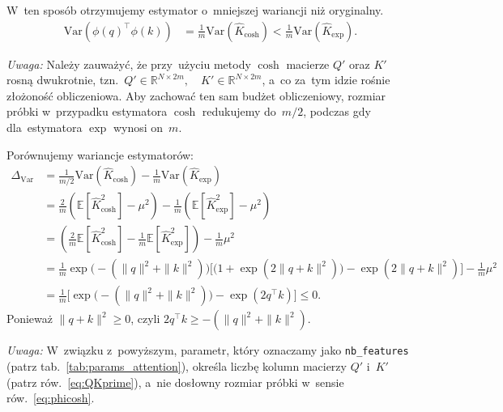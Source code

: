 \documentclass[a4paper,11pt,twoside]{report}
\theoremstyle{definition}
\begin{document}
W~ten sposób otrzymujemy estymator o~mniejszej wariancji niż oryginalny.
\begin{equation}
\begin{aligned}
\mathrm{Var}(\phi(q)^\top \phi(k)) &= \frac{1}{m} \mathrm{Var}(\hat K_{\mathrm{\cosh}}) <  \frac{1}{m} \mathrm{Var}(\hat K_{\mathrm{\exp}}).
\end{aligned}
\end{equation}




\textit{Uwaga:} Należy zauważyć, że przy~użyciu metody $\cosh$ macierze $Q'$ oraz $K'$ rosną dwukrotnie, tzn.\ $Q' \in \mathbb{R}^{N\times 2m}, \quad K' \in \mathbb{R}^{N\times 2m}$, a~co za~tym idzie rośnie złożoność obliczeniowa. Aby zachować ten sam budżet obliczeniowy, rozmiar próbki w~przypadku estymatora $\cosh$ redukujemy do~$m/2$, podczas gdy dla~estymatora $\exp$ wynosi on~$m$.

Porównujemy wariancje estymatorów: 
\begin{equation}
\begin{aligned}
\Delta_{\mathrm{Var}} 
&= \frac{1}{m/2} \mathrm{Var}(\hat K_{\cosh}) - \frac{1}{m} \mathrm{Var}(\hat K_{\exp}) \\
&= \frac{2}{m}\left(\mathbb{E}[\hat K_{\cosh}^2] - \mu^2\right) - \frac{1}{m}\left(\mathbb{E}[\hat K_{\exp}^2] - \mu^2\right) \\
&= \left( \frac{2}{m}\mathbb{E}[\hat K_{\cosh}^2] - \frac{1}{m}\mathbb{E}[\hat K_{\exp}^2] \right) - \frac{1}{m}\mu^2 \\
&= \frac{1}{m}\exp\big(-(\|q\|^2+\|k\|^2)\big)\Bigg[ \big(1+\exp(2\|q+k\|^2)\big) - \exp(2\|q+k\|^2) \Bigg] - \frac{1}{m}\mu^2 \\
&= \frac{1}{m} \big[ \exp\big(-(\|q\|^2+\|k\|^2)\big) - \exp(2q^\top k) \big] \leq 0.
\end{aligned}
\end{equation}
Ponieważ $\|q+k\|^2 \geq 0$, czyli $2q^\top k \geq -(\|q\|^2+\|k\|^2)$.

\textit{Uwaga:} W~związku z~powyższym, parametr, który oznaczamy jako \texttt{nb\_features} (patrz tab.~\ref{tab:params_attention}), określa liczbę kolumn macierzy $Q'$ i~$K'$ (patrz rów.~\eqref{eq:QKprime}), a~nie dosłowny rozmiar próbki w~sensie rów.~\eqref{eq:phicosh}.
\end{document}
